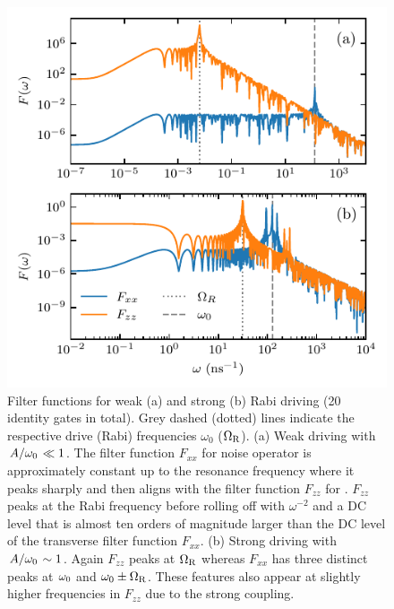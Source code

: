 \begin{figure}[tbp]
    \centering
    \includegraphics{img/pdf/rabi_driving_weak_vs_strong}
    \caption{
        Filter functions for weak (a) and strong (b) Rabi driving (\num{20} identity gates in total).
        Grey dashed (dotted) lines indicate the respective drive (Rabi) frequencies $\omega_0$ ($\Omega_{\mathrm{R}}$).
        (a) Weak driving with $\flatfrac{A}{\omega_\mr{0}}\ll 1$.
        The filter function $F_{xx}$ for noise operator \px is approximately constant up to the resonance frequency where it peaks sharply and then aligns with the filter function $F_{zz}$ for \pz.
        $F_{zz}$ peaks at the Rabi frequency before rolling off with $\omega^{-2}$ and a DC level that is almost ten orders of magnitude larger than the DC level of the transverse filter function $F_{xx}$.
        (b) Strong driving with $\flatfrac{A}{\omega_\mr{0}}\sim 1$.
        Again $F_{zz}$ peaks at $\Omega_{\mathrm{R}}$ whereas $F_{xx}$ has three distinct peaks at $\omega_{\mathrm{0}}$ and $\omega_{\mathrm{0}}\pm\Omega_{\mathrm{R}}$.
        These features also appear at slightly higher frequencies in $F_{zz}$ due to the strong coupling.
    }
    \label{fig:ff:filter_function:rabi:weak_vs_strong}
\end{figure}

